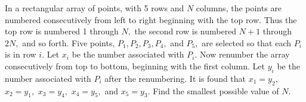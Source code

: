 In a rectangular array of points, with 5 rows and $N$ columns, the points are numbered consecutively from left to right beginning with the top row.  Thus the top row is numbered 1 through $N,$ the second row is numbered $N+1$ through $2N,$ and so forth.  Five points, $P_1, P_2, P_3, P_4,$ and $P_5,$ are selected so that each $P_i$ is in row $i.$  Let $x_i$ be the number associated with $P_i.$  Now renumber the array consecutively from top to bottom, beginning with the first column.  Let $y_i$ be the number associated with $P_i$ after the renumbering.  It is found that $x_1=y_2,$ $x_2=y_1,$ $x_3=y_4,$ $x_4=y_5,$ and $x_5=y_3.$  Find the smallest possible value of $N.$